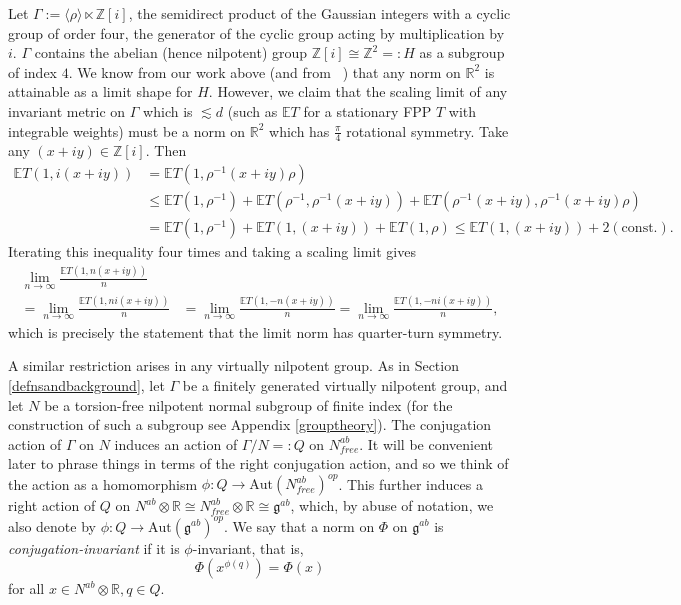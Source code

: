 \documentclass[12pt,reqno]{article}
\numberwithin{equation}{section}
\newcommand{\R}{\mathbb{R}}
\newcommand{\E}{\mathbb{E}}
\newcommand{\Z}{\mathbb{Z}}
\newcommand{\g}{\mathfrak{g}}
\newcommand{\Aut}{\mathrm{Aut}}
\begin{document}
Let $\Gamma := \langle \rho \rangle \ltimes \mathbb{Z}[i]$, the semidirect product of the Gaussian integers with a cyclic group of order four, the 
generator of the cyclic group acting by multiplication by $i$. $\Gamma$ contains the abelian (hence nilpotent) group $\Z[i] \cong \Z^2 =: H$ as
a subgroup of index $4$. We know from our work above (and from ~\cite{HaggstromMeester}) that any norm on $\R^2$ is attainable as a limit shape 
for $H$. However, we claim that the scaling limit of any invariant metric on $\Gamma$ which is $\lesssim d$ (such as $\E T$ for a stationary FPP 
$T$ with integrable weights) must be a norm on $\R^2$
which has $\frac{\pi}{4}$ rotational symmetry. Take any $(x + iy) \in \Z[i]$. Then
\begin{align*} 
   \E T(1,i(x+iy)) &= \E T(1, \rho^{-1}(x+iy)\rho) \\
   &\le \E T(1, \rho^{-1}) + \E T(\rho^{-1}, \rho^{-1}(x+iy)) + \E T(\rho^{-1}(x+iy), \rho^{-1}(x+iy)\rho) \\
   &= \E T(1, \rho^{-1}) + \E T(1, (x+iy)) + \E T(1, \rho) \le \E T(1, (x+iy)) + 2(\mathrm{const.}).
\end{align*}
Iterating this inequality four times and taking a scaling limit gives 
\begin{align*}
   \lim_{n \to \infty} \frac{\E T(1, n(x+iy))}{n}& \\
   =  \lim_{n \to \infty} \frac{\E T(1, ni(x+iy))}{n}
   &=\lim_{n \to \infty} \frac{\E T(1, -n(x+iy))}{n} = \lim_{n \to \infty} \frac{\E T(1, -ni(x+iy))}{n}, 
\end{align*}
which is precisely the statement that the limit norm has quarter-turn symmetry.

A similar restriction arises in any virtually nilpotent group. 
As in Section \ref{defnsandbackground}, let $\Gamma$ be a finitely generated virtually nilpotent group, and let $N$ be a 
torsion-free nilpotent normal subgroup of finite index (for the construction of such a subgroup see Appendix \ref{grouptheory}). 
The conjugation action of $\Gamma$
on $N$ induces an action of $\Gamma/N =: Q$ on $N^{ab}_{free}$. 
It will be convenient later to phrase things in terms of the
right conjugation action, and so we think of the action as a homomorphism $\phi: Q \to \Aut(N^{ab}_{free})^{op}$.
This further induces a right action of $Q$ on 
 $N^{ab} \otimes \R \cong N^{ab}_{free} \otimes \R \cong \g^{ab}$, which, by abuse of notation, we also denote by 
$\phi: Q \to \Aut(\g^{ab})^{op}$. 
We say that a norm on $\Phi$ on $\g^{ab}$ is \emph{conjugation-invariant} if it is $\phi$-invariant, that is,
\[ \Phi(x^{\phi(q)}) = \Phi(x) \]
for all $x \in N^{ab} \otimes \R, q \in Q$.
\end{document}
